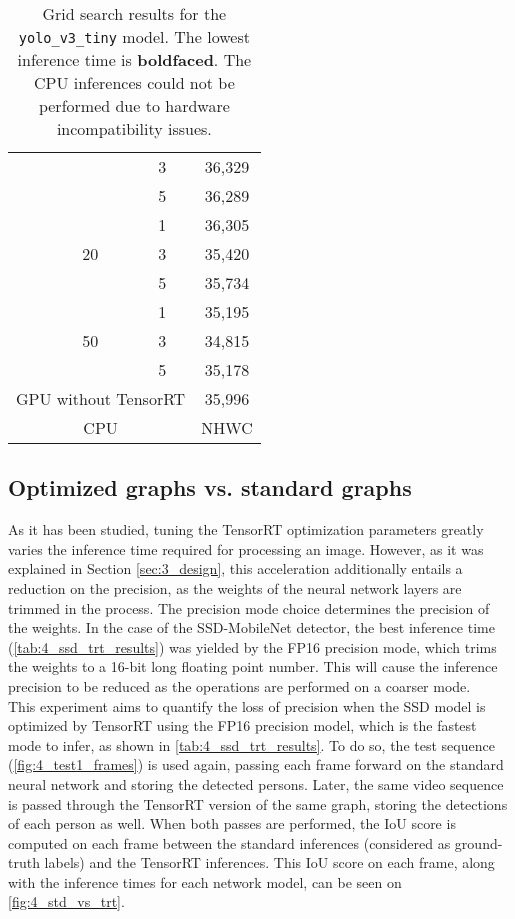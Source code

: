 \begin{table}[]
\begin{tabular}{|c|c|c|c|}
		&  & 3  & 36,329    \\ \cline{3-4} 
		&  & 5  & 36,289    \\ \cline{2-4} 
		& \multirow{3}{*}{20} & 1  & 36,305    \\ \cline{3-4} 
		&  & 3  & 35,420    \\ \cline{3-4} 
		&  & 5  & 35,734    \\ \cline{2-4} 
		& \multirow{3}{*}{50} & 1  & 35,195    \\ \cline{3-4} 
		&  & 3  & 34,815    \\ \cline{3-4} 
		&  & 5  & 35,178    \\ \hline
		\multicolumn{3}{|c|}{GPU without TensorRT}       & 35,996    \\ \hline
		\multicolumn{3}{|c|}{CPU}          & NHWC      \\ \hline
	\end{tabular}
	\caption{Grid search results for the \texttt{yolo\_v3\_tiny} model. The lowest inference time is \textbf{boldfaced}. The CPU inferences could not be performed due to hardware incompatibility issues.}
	\label{tab:4_yolo_trt_results}
\end{table}

\vspace{5cm}
\subsection{Optimized graphs vs. standard graphs}
\label{sec:4_test3}

As it has been studied, tuning the TensorRT optimization parameters greatly varies the inference time required for processing an image. However, as it was explained in Section \ref{sec:3_design}, this acceleration additionally entails a reduction on the precision, as the weights of the neural network layers are trimmed in the process. The precision mode choice determines the precision of the weights. In the case of the SSD-MobileNet detector, the best inference time (\autoref{tab:4_ssd_trt_results}) was yielded by the FP16 precision mode, which trims the weights to a 16-bit long floating point number. This will cause the inference precision to be reduced as the operations are performed on a coarser mode.\\

This experiment aims to quantify the loss of precision when the SSD model is optimized by TensorRT using the FP16 precision model, which is the fastest mode to infer, as shown in \autoref{tab:4_ssd_trt_results}. To do so, the test sequence (\autoref{fig:4_test1_frames}) is used again, passing each frame forward on the standard neural network and storing the detected persons. Later, the same video sequence is passed through the TensorRT version of the same graph, storing the detections of each person as well. When both passes are performed, the IoU score is computed on each frame between the standard inferences (considered as ground-truth labels) and the TensorRT inferences. This IoU score on each frame, along with the inference times for each network model, can be seen on \autoref{fig:4_std_vs_trt}.

